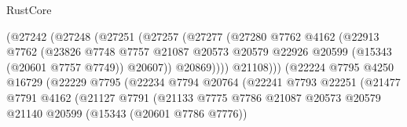 \begin{lexlean}{RustCore}
\begin{coremodule}
                                      (@27242
                                        (@27248
                                          (@27251
                                            (@27257
                                              (@27277
                                                (@27280
                                                  @7762
                                                  @4162
                                                  (@22913
                                                    @7762
                                                    (@23826
                                                      @7748
                                                      @7757
                                                      @21087
                                                      @20573
                                                      @20579
                                                      @22926
                                                      @20599
                                                      (@15343 (@20601 @7757 @7749))
                                                      @20607))
                                                  @20869))))
                                          @21108)))
                                    (@22224
                                      @7795
                                      @4250
                                      @16729
                                      (@22229
                                        @7795
                                        (@22234
                                          @7794
                                          @20764
                                          (@22241
                                            @7793
                                            @22251
                                            (@21477
                                              @7791
                                              @4162
                                              (@21127
                                                @7791
                                                (@21133
                                                  @7775
                                                  @7786
                                                  @21087
                                                  @20573
                                                  @20579
                                                  @21140
                                                  @20599
                                                  (@15343 (@20601 @7786 @7776))

\end{coremodule}
\end{lexlean}
